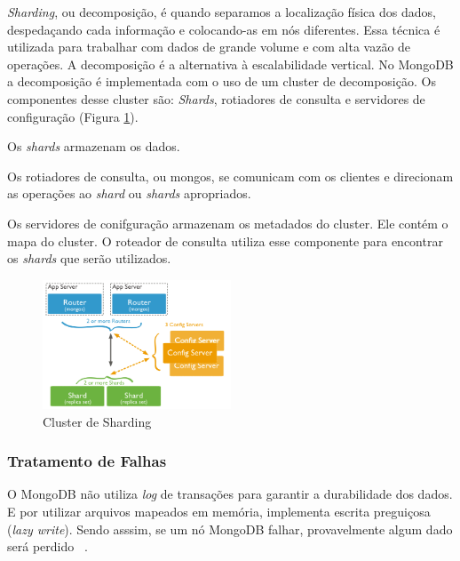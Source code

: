 \textit{Sharding}, ou decomposição, é quando separamos a localização física dos dados, despedaçando cada informação e colocando-as em nós diferentes. Essa técnica é utilizada para trabalhar com dados de grande volume e com alta vazão de operações. A decomposição é a alternativa à escalabilidade vertical. No MongoDB a decomposição é implementada com o uso de um cluster de decomposição. Os componentes desse cluster são: \textit{Shards}, rotiadores de consulta e servidores de configuração (Figura \ref{fig:sharding}).

Os \textit{shards} armazenam os dados.

Os rotiadores de consulta, ou mongos, se comunicam com os clientes e direcionam as operações ao \textit{shard} ou \textit{shards} apropriados.

Os servidores de conifguração armazenam os metadados do cluster. Ele contém o mapa do cluster. O roteador de consulta utiliza esse componente para encontrar os \textit{shards} que serão utilizados.

	\begin{figure}[!htbp]
		\begin{center}
			\includegraphics[width=0.5\textwidth]{sharding}
		\end{center}
		\caption{Cluster de Sharding ~\cite{sitemongodb}}
		\label{fig:sharding}
	\end{figure}

\subsubsection{Tratamento de Falhas}

O MongoDB não utiliza \textit{log}  de transações para garantir a durabilidade dos dados. E por utilizar arquivos mapeados em memória, implementa escrita preguiçosa (\textit{lazy write}). Sendo asssim, se um nó MongoDB falhar, provavelmente algum dado será perdido ~\cite{Orendanalysisand}.